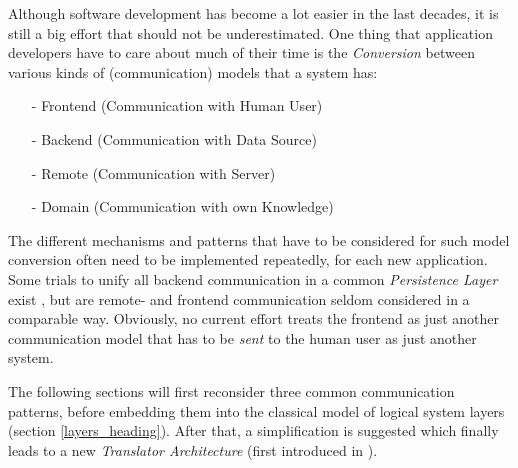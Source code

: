 Although software development has become a lot easier in the last decades, it is
still a big effort that should not be underestimated. One thing that application
developers have to care about much of their time is the \emph{Conversion}
between various kinds of (communication) models that a system has:

\begin{itemize}
    \item[-] Frontend (Communication with Human User)
    \item[-] Backend (Communication with Data Source)
    \item[-] Remote (Communication with Server)
    \item[-] Domain (Communication with own Knowledge)
\end{itemize}

The different mechanisms and patterns that have to be considered for such model
conversion often need to be implemented repeatedly, for each new application.
Some trials to unify all backend communication in a common \emph{Persistence Layer}
exist \cite{ambler}, but are remote- and frontend communication seldom considered
in a comparable way. Obviously, no current effort treats the frontend as just
another communication model that has to be \emph{sent} to the human user as
just another system.

The following sections will first reconsider three common communication
patterns, before embedding them into the classical model of logical system
layers (section \ref{layers_heading}). After that, a simplification is
suggested which finally leads to a new \emph{Translator Architecture} (first
introduced in \cite{hellerkunze}).
